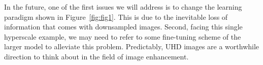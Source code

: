 \documentclass{article}
\begin{document}
In the future, one of the first issues we will address is to change the learning paradigm shown in Figure~\ref{fig:fig1}.
%
This is due to the inevitable loss of information that comes with downsampled images.
%
Second, facing this single hyperscale example, we may need to refer to some fine-tuning scheme of the larger model to alleviate this problem.
%
Predictably, UHD images are a worthwhile direction to think about in the field of image enhancement.
%


%


\end{document}
